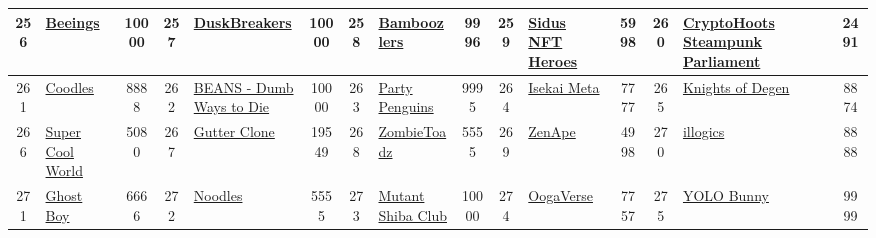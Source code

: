 \begin{table*}[]
{\begin{tabular}{|c|l|c|c|l|c|c|l|c|c|l|c|c|l|c|}
        256   & \href{http://thebeeings.io}{Beeings}                                               & 10000             & 257   & \href{http://duskbreakers.gg}{DuskBreakers}                                                       & 10000             & 258   & \href{https://bamboozlersnft.github.io/garden}{Bamboozlers}                       & 9996              & 259   & \href{https://sidusheroes.com}{Sidus NFT Heroes}                              & 5998              & 260   & \href{https://www.cryptohoots.com/}{CryptoHoots Steampunk Parliament}                     & 2491                                    \\ \hline
        261   & \href{https://nft.coodles.io/}{Coodles}                                            & 8888              & 262   & \href{https://www.beansnfts.io/}{BEANS - Dumb Ways to Die}                                        & 10000             & 263   & \href{https://partypenguins.club}{Party Penguins}                                 & 9995              & 264   & \href{http://isekaimeta.com}{Isekai Meta}                                     & 7777              & 265   & \href{https://www.knightsofdegen.io/}{Knights of Degen}                                   & 8874                                    \\ \hline
        266   & \href{http://thegoda.io}{Super Cool World}                                         & 5080              & 267   & \href{https://guttercatgang.com}{Gutter Clone}                                                    & 19549             & 268   & \href{https://opensea.io/collection/zombietoadzofficial}{ZombieToadz}             & 5555              & 269   & \href{http://zenape.io}{ZenApe}                                               & 4998              & 270   & \href{https://www.illogics.io/}{illogics}                                                 & 8888                                    \\ \hline
        271   & \href{http://www.ghostboy.rip}{Ghost Boy}                                          & 6666              & 272   & \href{https://www.noodles.app/}{Noodles}                                                          & 5555              & 273   & \href{https://www.mutantshiba.club/}{Mutant Shiba Club}                           & 10000             & 274   & \href{https://oogaverse.com}{OogaVerse}                                       & 7757              & 275   & \href{https://www.muverse.info/nftInfo}{YOLO Bunny}                                       & 9999                                    \\ \hline

\end{tabular}}
\end{table*}

